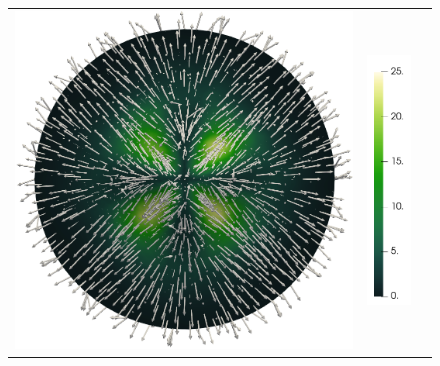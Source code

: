\begin{figure}[H]
\begin{center}
\begin{tabular}[c]{c c c}
			\includegraphics[scale=.15]{trueVelocity_glyphs.png} &
			\includegraphics[scale=.18]{velocityColorBar.png} \\

\end{tabular}
\end{center}
\end{figure}
